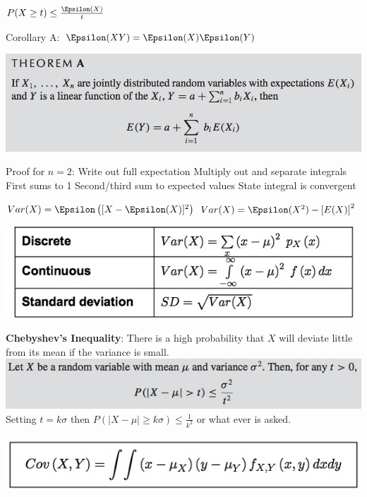 \documentclass{/out/app/latex/examnotes}
\begin{document}
{
$P(X\ge t)\le \frac{\Epsilon(X)}{t}$

\ra Corollary A:  $\E(XY)=\E(X)\E(Y)$

\includegraphics[scale=0.4]{./img/412A.jpg}

\ra Proof for $n=2$: 
 Write out full expectation
 Multiply out and separate integrals
 First sums to 1
 Second/third sum to expected values
 State integral is convergent


$Var(X)=\E\left([X-\E(X)]^2\right) $
$Var(X)=\E(X^2)-\left[E(X)\right]^2$

\vspace{6pt}
\includegraphics[scale=0.4]{./img/42.jpg}

\vspace{6pt}
{\bf Chebyshev's Inequality}: There is a high probability that $X$ will deviate little from its mean if the variance is small.
\vspace{6pt}
\includegraphics[scale=0.5]{./img/421.jpg}
Setting $t=k\sigma$ then $P(|X-\mu|\ge k\sigma)\le \displaystyle\frac{1}{k^2}$ or what ever is asked.

\disobeylines
{} %
\obeylines
\includegraphics[scale=0.5]{./img/43.jpg}

}
\end{document}
